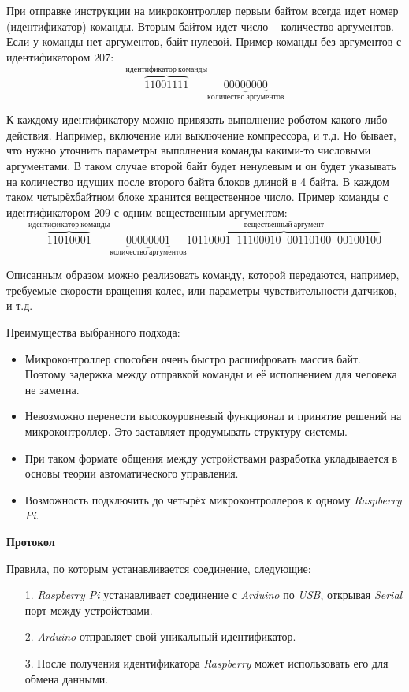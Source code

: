 При отправке инструкции на микроконтроллер первым байтом всегда идет номер (идентификатор) команды. Вторым байтом идет число -- количество аргументов. Если у команды нет аргументов, байт нулевой. Пример команды без аргументов с идентификатором $ 207 $:
\begin{equation*}
    \overbrace{11001111}^{идентификатор\: команды} \underbrace{00000000}_{количество\: аргументов}
\end{equation*}

К каждому идентификатору можно привязать выполнение роботом какого-либо действия. Например, включение или выключение компрессора, и т.д. Но бывает, что нужно уточнить параметры выполнения команды какими-то числовыми аргументами. В таком случае второй байт будет ненулевым и он будет указывать на количество идущих после второго байта блоков длиной в 4 байта. В каждом таком четырёхбайтном блоке хранится вещественное число. Пример команды с идентификатором $ 209 $ с одним вещественным аргументом:
\begin{equation*}
    \overbrace{11010001}^{идентификатор\: команды} \underbrace{00000001}_{количество\: аргументов} \overbrace{10110001 \;\; 11100010 \;\; 00110100 \;\; 00100100}^{вещественный \: аргумент}
\end{equation*}

Описанным образом можно реализовать команду, которой передаются, например, требуемые скорости вращения колес, или параметры чувствительности датчиков, и т.д.

Преимущества выбранного подхода:
\begin{itemize}
    \item Микроконтроллер способен очень быстро расшифровать массив байт. Поэтому задержка между отправкой команды и её исполнением для человека не заметна.
    \item Невозможно перенести высокоуровневый функционал и принятие решений на микроконтроллер. Это заставляет продумывать структуру системы.
    \item При таком формате общения между устройствами разработка  укладывается в основы теории автоматического управления.
    \item Возможность подключить до четырёх микроконтроллеров к одному \textit{Raspberry Pi}.
\end{itemize}

\textbf{Протокол}

Правила, по которым устанавливается соединение, следующие:
\begin{itemize}
    \item[1.] \textit{Raspberry Pi} устанавливает соединение с \textit{Arduino} по \textit{USB}, открывая \textit{Serial} порт между устройствами.
    \item[2.] \textit{Arduino} отправляет свой уникальный идентификатор.
    \item[3.] После получения идентификатора \textit{Raspberry} может использовать его для обмена данными. 
\end{itemize}

